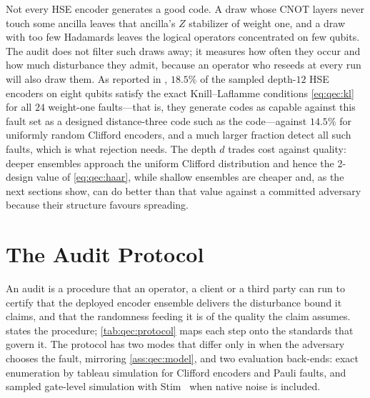 Not every HSE encoder generates a good code. A draw whose CNOT layers never touch some ancilla leaves that ancilla's $Z$ stabilizer of weight one, and a draw with too few Hadamards leaves the logical operators concentrated on few qubits. The audit does not filter such draws away; it measures how often they occur and how much disturbance they admit, because an operator who reseeds at every run will also draw them. As reported in \cite{guo2026qecaudit}, $18.5\%$ of the sampled depth-$12$ HSE encoders on eight qubits satisfy the exact Knill--Laflamme conditions \cref{eq:qec:kl} for all $24$ weight-one faults---that is, they generate codes as capable against this fault set as a designed distance-three code such as the  code---against $14.5\%$ for uniformly random Clifford encoders, and a much larger fraction detect all such faults, which is what rejection needs. The depth $d$ trades cost against quality: deeper ensembles approach the uniform Clifford distribution and hence the 2-design value of \cref{eq:qec:haar}, while shallow ensembles are cheaper and, as the next sections show, can do better than that value against a committed adversary because their structure favours spreading.

\section{The Audit Protocol}\label{sec:qec:protocol}

An audit is a procedure that an operator, a client or a third party can run to certify that the deployed encoder ensemble delivers the disturbance bound it claims, and that the randomness feeding it is of the quality the claim assumes.  states the procedure; \cref{tab:qec:protocol} maps each step onto the standards that govern it. The protocol has two modes that differ only in when the adversary chooses the fault, mirroring \cref{ass:qec:model}, and two evaluation back-ends: exact enumeration by tableau simulation for Clifford encoders and Pauli faults, and sampled gate-level simulation with Stim~\cite{gidney2021stim} when native noise is included.

